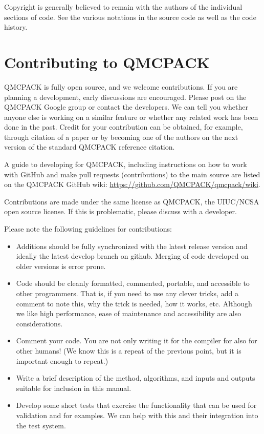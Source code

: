 Copyright is generally believed to remain with the authors of the
individual sections of code. See the various notations in the source code as
well as the code history.

\section{Contributing to QMCPACK}
\label{sec:contributing}

QMCPACK is fully open source, and we welcome contributions. If you are
planning a development, early discussions are encouraged. Please
post on the QMCPACK Google group or contact the developers. We can tell you whether anyone else is working on a similar feature or whether
any related work has been done in the past.  Credit for your
contribution can be obtained, for example, through citation of a paper or by
becoming one of the authors on the next version of the standard
QMCPACK reference citation.

A guide to developing for QMCPACK, including instructions on how to
work with GitHub and make pull requests (contributions) to the main
source are listed on the QMCPACK GitHub wiki:
\url{https://github.com/QMCPACK/qmcpack/wiki}.

Contributions are made under the same license as QMCPACK, the
UIUC/NCSA open source license. If this is problematic, please discuss
with a developer.

Please note the following guidelines for contributions:
\begin{itemize}
\item Additions should be fully synchronized with the latest release
  version and ideally the latest develop branch on github. Merging of code
  developed on older versions is error prone.
\item Code should be cleanly formatted, commented, portable, and accessible to
  other programmers. That is, if you need to use any clever tricks, add a comment
  to note this, why the trick is needed, how it works, etc. Although we like
  high performance, ease of maintenance and accessibility are also
  considerations.
\item Comment your code. You are not only writing it for the compiler
  for also for other humans! (We know this is a repeat of the previous
  point, but it is important enough to repeat.)
\item Write a brief description of the method, algorithms, and inputs and outputs
  suitable for inclusion in this manual.
\item Develop some short tests that exercise the
  functionality that can be used for validation and for examples. We
  can help with this and their integration into the test system.
\end{itemize}

